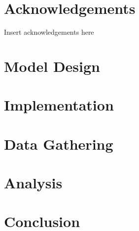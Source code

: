 \documentclass[12pt,a4paper]{article}
\begin{document}

\pagebreak

\pagebreak

\pagebreak

\begin{abstract}
\end{abstract}
\pagebreak

\tableofcontents
\newpage

\listoffigures
\newpage

\renewcommand\lstlistlistingname{List of Listings}
\lstlistoflistings{}
\newpage

\listoftables
\newpage

\section*{Acknowledgements}
Insert acknowledgements here
\subsection*{}
\newpage





\section{Model Design}

\section{Implementation}

\section{Data Gathering}

\section{Analysis}

\section{Conclusion}

\setlength{\bibitemsep}{0.5\baselineskip}




\pagebreak

\end{document}
